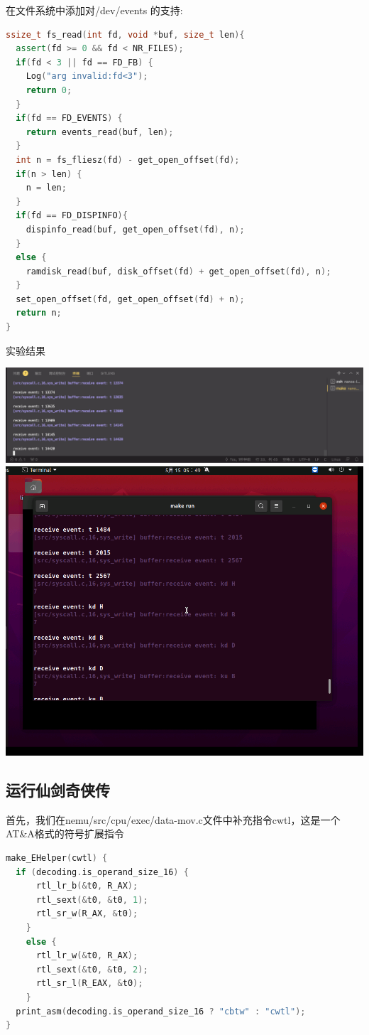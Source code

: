 \documentclass[UTF8,a4paper,10pt]{ctexart}
\begin{document}
在文件系统中添加对/dev/events 的支持:
\begin{lstlisting}[language = C++]
ssize_t fs_read(int fd, void *buf, size_t len){
  assert(fd >= 0 && fd < NR_FILES);
  if(fd < 3 || fd == FD_FB) {
    Log("arg invalid:fd<3");
    return 0;
  }
  if(fd == FD_EVENTS) {
    return events_read(buf, len);
  }
  int n = fs_fliesz(fd) - get_open_offset(fd);
  if(n > len) {
    n = len;
  }
  if(fd == FD_DISPINFO){
    dispinfo_read(buf, get_open_offset(fd), n);
  }
  else {
    ramdisk_read(buf, disk_offset(fd) + get_open_offset(fd), n);
  }
  set_open_offset(fd, get_open_offset(fd) + n);
  return n;
}
\end{lstlisting}

实验结果
\begin{center}
  \includegraphics*[scale = 0.3]{pic/6}
  \includegraphics*[scale = 0.3]{pic/7}
\end{center}

\subsection{运行仙剑奇侠传}
首先，我们在nemu/src/cpu/exec/data-mov.c文件中补充指令cwtl，这是一个AT\&A格式的符号扩展指令
\begin{lstlisting}[language = C++]
make_EHelper(cwtl) {
  if (decoding.is_operand_size_16) {
      rtl_lr_b(&t0, R_AX);
      rtl_sext(&t0, &t0, 1);
      rtl_sr_w(R_AX, &t0);
    } 
    else {
      rtl_lr_w(&t0, R_AX);
      rtl_sext(&t0, &t0, 2);
      rtl_sr_l(R_EAX, &t0);
    }
  print_asm(decoding.is_operand_size_16 ? "cbtw" : "cwtl");
}
\end{lstlisting}
\end{document}
